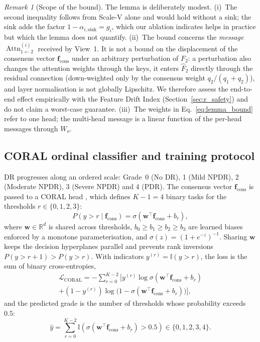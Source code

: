 \documentclass[final,5p,times,twocolumn,authoryear]{elsarticle}
\newcommand{\Attn}[1]{\operatorname{Attn}_{1\leftarrow 2}^{(#1)}}
\theoremstyle{plain}
\theoremstyle{remark}
\newtheorem{remark}{Remark}
\begin{document}
\begin{remark}[Scope of the bound]
\label{rem:scope}
The lemma is deliberately modest. (i)~The second inequality follows from Scale-V alone and would hold without a sink; the sink adds the factor $1-\alpha_{i,\text{sink}} = g_i$, which our ablation indicates helps in practice but which the lemma does not quantify. (ii)~The bound concerns the \emph{message} $\Attn{i}$ received by View~1. It is not a bound on the displacement of the consensus vector $\mathbf{f}_{\text{cons}}$ under an arbitrary perturbation of $F_2$: a perturbation also changes the attention weights through the keys, it enters $\hat{F}_2$ directly through the residual connection (down-weighted only by the consensus weight $q_2/(q_1+q_2)$), and layer normalisation is not globally Lipschitz. We therefore assess the end-to-end effect empirically with the Feature Drift Index (Section~\ref{sec:r_safety}) and do not claim a worst-case guarantee. (iii)~The weights in Eq.~\eqref{eq:lemma_bound} refer to one head; the multi-head message is a linear function of the per-head messages through $W_o$.
\end{remark}

\subsection{CORAL ordinal classifier and training protocol}
\label{sec:training}

DR progresses along an ordered scale: Grade~0 (No DR), 1 (Mild NPDR), 2 (Moderate NPDR), 3 (Severe NPDR) and 4 (PDR). The consensus vector $\mathbf{f}_{\text{cons}}$ is passed to a CORAL head \citep{Cao2020coral}, which defines $K-1 = 4$ binary tasks for the thresholds $r \in \{0, 1, 2, 3\}$:
\begin{equation}
  P(y > r \mid \mathbf{f}_{\text{cons}}) = \sigma(\mathbf{w}^\top \mathbf{f}_{\text{cons}} + b_r),
  \label{eq:coral_prob}
\end{equation}
where $\mathbf{w} \in \mathbb{R}^{d}$ is shared across thresholds, $b_0 \ge b_1 \ge b_2 \ge b_3$ are learned biases enforced by a monotone parameterisation, and $\sigma(z) = (1 + e^{-z})^{-1}$. Sharing $\mathbf{w}$ keeps the decision hyperplanes parallel and prevents rank inversions $P(y > r+1) > P(y > r)$. With indicators $y^{(r)} = \mathbb{I}(y > r)$, the loss is the sum of binary cross-entropies,
\begin{multline}
  \mathcal{L}_{\text{CORAL}} = -\sum_{r=0}^{K-2} \Big[ y^{(r)} \log \sigma(\mathbf{w}^\top \mathbf{f}_{\text{cons}} + b_r) \\
  + (1 - y^{(r)}) \log\bigl(1 - \sigma(\mathbf{w}^\top \mathbf{f}_{\text{cons}} + b_r)\bigr) \Big],
  \label{eq:l_coral}
\end{multline}
and the predicted grade is the number of thresholds whose probability exceeds $0.5$:
\begin{equation}
  \hat{y} = \sum_{r=0}^{K-2} \mathbb{I}\left( \sigma(\mathbf{w}^\top \mathbf{f}_{\text{cons}} + b_r) > 0.5 \right) \in \{0, 1, 2, 3, 4\}.
  \label{eq:coral_predict}
\end{equation}
\end{document}
